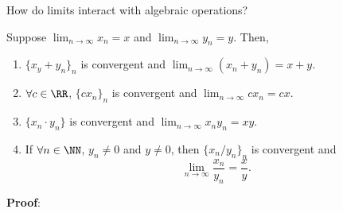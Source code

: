 \begin{question}
How do limits interact with algebraic operations?
\end{question}
\begin{theorem}
Suppose $\lim_{n\to \infty}x_n = x$ and $\lim_{n\to \infty} y_n = y.$ Then,
\begin{enumerate}
    \item $\{x_y + y_n\}_n$ is convergent and $\lim_{n\to \infty} (x_n+y_n) = x+y.$
    \item $\forall c\in\RR$, $\{cx_n\}_n$ is convergent and $\lim_{n\to \infty} cx_n = cx$.
    \item $\{x_n \cdot y_n\}$ is convergent and $\lim_{n\to \infty} x_ny_n = xy$.
    \item If $\forall n\in\NN$, $y_n \neq 0$ and $y\neq 0$, then $\{x_n/y_n\}_n$ is convergent and \[
    \lim_{n\to \infty} \frac{x_n}{y_n}=\frac{x}{y}.
    \]
\end{enumerate}
\end{theorem}
\textbf{Proof}:
